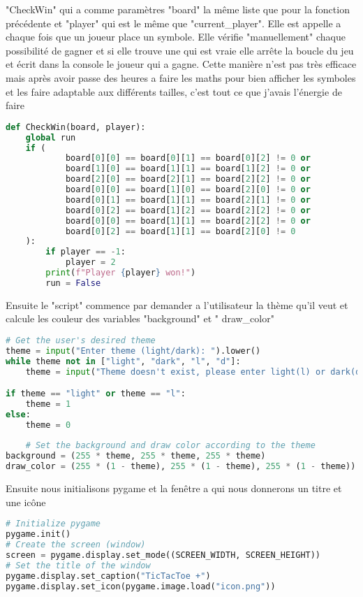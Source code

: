 \documentclass[12pt]{article}
\begin{document}
\newpage
"CheckWin" qui a comme paramètres "board" la même liste que pour la fonction précédente et "player" qui est le même que "current\_player". Elle est appelle a chaque fois que un joueur place un symbole. Elle vérifie "manuellement" chaque possibilité de gagner et si elle trouve une qui est vraie elle arrête la boucle du jeu et écrit dans la console le joueur qui a gagne. Cette manière n'est pas très efficace mais après avoir passe des heures a faire les maths pour bien afficher les symboles et les faire adaptable aux différents tailles, c'est tout ce que j'avais l'énergie de faire
   \begin{lstlisting}[language=Python]
def CheckWin(board, player):
    global run
    if (
            board[0][0] == board[0][1] == board[0][2] != 0 or
            board[1][0] == board[1][1] == board[1][2] != 0 or
            board[2][0] == board[2][1] == board[2][2] != 0 or
            board[0][0] == board[1][0] == board[2][0] != 0 or
            board[0][1] == board[1][1] == board[2][1] != 0 or
            board[0][2] == board[1][2] == board[2][2] != 0 or
            board[0][0] == board[1][1] == board[2][2] != 0 or
            board[0][2] == board[1][1] == board[2][0] != 0
    ):
        if player == -1:
            player = 2
        print(f"Player {player} won!")
        run = False \end{lstlisting}

Ensuite le "script" commence par demander a l'utilisateur la thème qu'il veut et calcule les couleur des variables "background" et " draw\_color"
   \begin{lstlisting}[language=Python]
# Get the user's desired theme
theme = input("Enter theme (light/dark): ").lower()
while theme not in ["light", "dark", "l", "d"]:
    theme = input("Theme doesn't exist, please enter light(l) or dark(d): ").lower()

if theme == "light" or theme == "l":
    theme = 1
else:
    theme = 0
    
    # Set the background and draw color according to the theme
background = (255 * theme, 255 * theme, 255 * theme)
draw_color = (255 * (1 - theme), 255 * (1 - theme), 255 * (1 - theme)) \end{lstlisting}

\newpage
Ensuite nous initialisons pygame et la fenêtre a qui nous donnerons un titre et une icône
   \begin{lstlisting}[language=Python]
# Initialize pygame
pygame.init()
# Create the screen (window)
screen = pygame.display.set_mode((SCREEN_WIDTH, SCREEN_HEIGHT))
# Set the title of the window
pygame.display.set_caption("TicTacToe +")
pygame.display.set_icon(pygame.image.load("icon.png")) \end{lstlisting}
\end{document}
